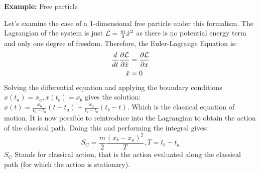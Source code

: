 \vspace{1mm}\noindent \textbf{Example:} Free particle 


\vspace{1mm}\noindent Let's examine the case of a 1-dimensional free particle under this formalism. The Lagrangian of the system is just $\mathcal{L} = \frac{m}{2}\dot x^2$ as there is no potential energy term and only one degree of freedom. Therefore, the Euler-Lagrange Equation is:
\begin{align}
         \frac{d}{dt} \frac{\partial  \mathcal{L}}{\partial \dot x} &=   \frac{\partial  \mathcal{L}}{\partial x} \\
         \ddot x &=0
\end{align}
Solving the differential equation and applying the boundary conditions $x(t_a) =x_a, x(t_b) = x_b$ gives the solution: $x(t) = \frac{x_b}{t_b-t_a}(t-t_a)+\frac{x_a}{t_b-t_a}(t_b-t) $. Which is the classical equation of motion. It is now possible to reintroduce into the Lagrangian to obtain the action of the classical path. Doing this and performing the integral gives:
\begin{equation}
    S_{\text{C}} = \frac{m}{2}\frac{(x_b-x_a)^2}{T}, T = t_b-t_a
\end{equation}
$  S_{\text{C}}$ Stands for classical action, that is the action evaluated along the classical path (for which the action is stationary).

